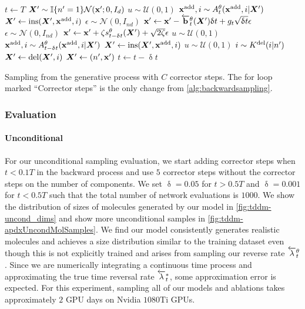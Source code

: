 \begin{algorithm}
\begin{algorithmic}[1]
    \State $t \leftarrow T$
    \State ${\bm{X}}' \sim \mathbb{I}\{ n'=1\} \mathcal{N}({\mathbf{x}}'; 0, I_{d})$
    \State $u \sim \mathcal{U}(0, 1)$
    \State ${\mathbf{x}}^{\textup{add}}, i \sim A_{t}^\theta({\mathbf{x}}^{\textup{add}}, i | {\bm{X}}')$
    \State ${\bm{X}}' \leftarrow \text{ins}({\bm{X}}', {\mathbf{x}}^{\textup{add}}, i)$
    \EndIf
    \State  $\epsilon \sim \mathcal{N}(0, I_{nd})$
    \State ${\mathbf{x}}' \leftarrow {\mathbf{x}}' - \overleftarrow{\mathbf{b}}_{t}^\theta({\bm{X}}') \updelta t + g_{t} \sqrt{\updelta t} \epsilon$
        \State $\epsilon \sim \mathcal{N}(0, I_{nd})$
        \State ${\mathbf{x}}' \leftarrow {\mathbf{x}}' + \zeta s_{t-\updelta t}^\theta({\bm{X}}') + \sqrt{2 \zeta} \epsilon$
        \State $u \sim \mathcal{U}(0, 1)$
        \State ${\mathbf{x}}^{\textup{add}}, i \sim A_{t-\updelta t}^\theta({\mathbf{x}}^{\textup{add}}, i | {\bm{X}}')$
        \State ${\bm{X}}' \leftarrow \text{ins}({\bm{X}}', {\mathbf{x}}^{\textup{add}}, i)$
        \EndIf
        \State $u \sim \mathcal{U}(0, 1)$
            \State $i \sim K^{\textup{del}}(i | n')$
            \State ${\bm{X}}' \leftarrow \text{del}({\bm{X}}', i)$
        \EndIf
    \EndFor
    \State ${\bm{X}}' \leftarrow (n', {\mathbf{x}}')$
    \State $t \leftarrow t - \updelta t$
    \EndWhile
\end{algorithmic}
\caption{Sampling from the generative process with $C$ corrector steps. The for loop marked ``Corrector steps'' is the only change from \cref{alg:backwardsampling}.}
\label{alg:backwardsamplingWithCorrector}
\end{algorithm}

\subsubsection{Evaluation}
\paragraph{Unconditional}
For our unconditional sampling evaluation, we start adding corrector steps when $t<0.1T$ in the backward process and use $5$ corrector steps without the corrector steps on the number of components. We set $\updelta = 0.05$ for $ t > 0.5T$ and $\updelta = 0.001$ for $t<0.5T$ such that the total number of network evaluations is $1000$. We show the distribution of sizes of molecules generated by our model in \cref{fig:tddm-uncond_dims} and show more unconditional samples in \cref{fig:tddm-apdxUncondMolSamples}. We find our model consistently generates realistic molecules and achieves a size distribution similar to the training dataset even though this is not explicitly trained and arises from sampling our reverse rate $\overleftarrow{\lambda}_t^\theta$. Since we are numerically integrating a continuous time process and approximating the true time reversal rate $\overleftarrow{\lambda}_t^*$, some approximation error is expected. For this experiment, sampling all of our models and ablations takes approximately $2$ GPU days on Nvidia $1080$Ti GPUs.

